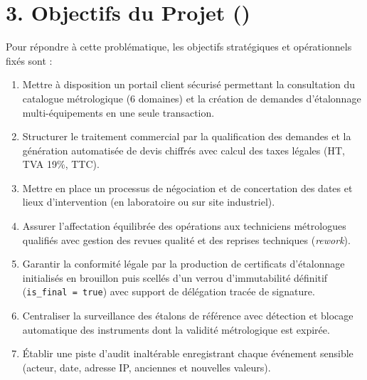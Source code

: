 \documentclass{bts-report}
\begin{document}
\section*{3. Objectifs du Projet ()}
Pour r\'epondre \`a cette probl\'ematique, les objectifs strat\'egiques et op\'erationnels fix\'es sont :
\begin{enumerate}
  \item Mettre \`a disposition un portail client s\'ecuris\'e permettant la consultation du catalogue m\'etrologique (6 domaines) et la cr\'eation de demandes d'\'etalonnage multi-\'equipements en une seule transaction.
  \item Structurer le traitement commercial par la qualification des demandes et la g\'en\'eration automatis\'ee de devis chiffr\'es avec calcul des taxes l\'egales (HT, TVA 19\%, TTC).
  \item Mettre en place un processus de n\'egociation et de concertation des dates et lieux d'intervention (en laboratoire ou sur site industriel).
  \item Assurer l'affectation \'equilibr\'ee des op\'erations aux techniciens m\'etrologues qualifi\'es avec gestion des revues qualit\'e et des reprises techniques (\textit{rework}).
  \item Garantir la conformit\'e l\'egale par la production de certificats d'\'etalonnage initialis\'es en brouillon puis scell\'es d'un verrou d'immutabilit\'e d\'efinitif (\texttt{is\_final = true}) avec support de d\'el\'egation trac\'ee de signature.
  \item Centraliser la surveillance des \'etalons de r\'ef\'erence avec d\'etection et blocage automatique des instruments dont la validit\'e m\'etrologique est expir\'ee.
  \item \'Etablir une piste d'audit inalt\'erable enregistrant chaque \'ev\'enement sensible (acteur, date, adresse IP, anciennes et nouvelles valeurs).
\end{enumerate}
\end{document}
